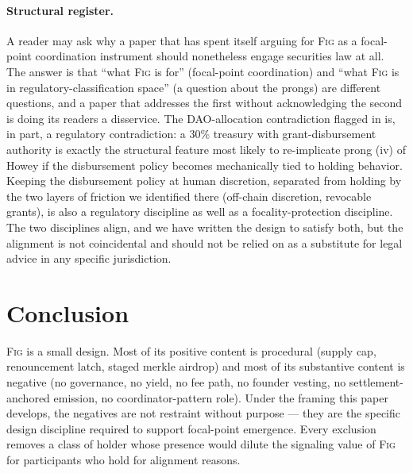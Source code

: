 \documentclass[11pt,a4paper]{article}
\theoremstyle{definition}
\theoremstyle{remark}
\newcommand{\fig}{\textsc{Fig}}
\begin{document}
\paragraph{Structural register.}
A reader may ask why a paper that has spent itself arguing for
\fig{} as a focal-point coordination instrument should
nonetheless engage securities law at all. The answer is that
``what \fig{} is for'' (focal-point coordination) and ``what
\fig{} is in regulatory-classification space'' (a question
about the prongs) are different questions, and a paper that
addresses the first without acknowledging the second is doing
its readers a disservice. The DAO-allocation contradiction
flagged in  is, in part, a regulatory
contradiction: a 30\% treasury with grant-disbursement
authority is exactly the structural feature most likely to
re-implicate prong (iv) of Howey if the disbursement policy
becomes mechanically tied to holding behavior. Keeping the
disbursement policy at human discretion, separated from
holding by the two layers of friction we identified there
(off-chain discretion, revocable grants), is also a regulatory
discipline as well as a focality-protection discipline. The
two disciplines align, and we have written the design to
satisfy both, but the alignment is not coincidental and should
not be relied on as a substitute for legal advice in any
specific jurisdiction.

\section{Conclusion}
\label{sec:conclusion}

\fig{} is a small design. Most of its positive content is
procedural (supply cap, renouncement latch, staged merkle
airdrop) and most of its substantive content is negative (no
governance, no yield, no fee path, no founder vesting, no
settlement-anchored emission, no coordinator-pattern role).
Under the framing this paper develops, the negatives are not
restraint without purpose --- they are the specific design
discipline required to support focal-point emergence. Every
exclusion removes a class of holder whose presence would dilute
the signaling value of \fig{} for participants who hold for
alignment reasons.
\end{document}
